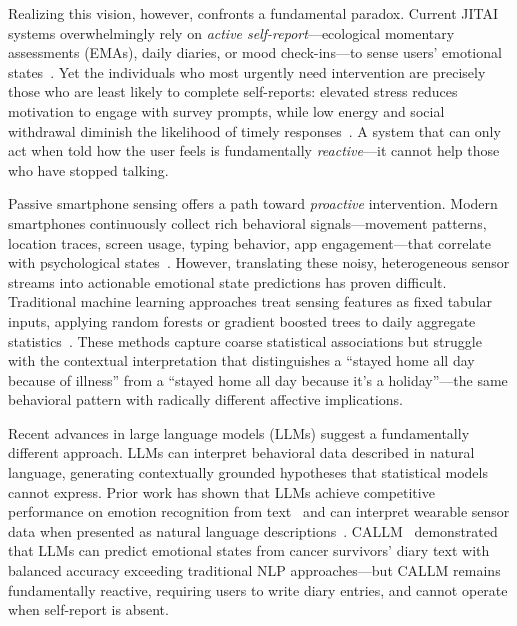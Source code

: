 \documentclass[screen,review,anonymous]{acmart}
\begin{document}
Realizing this vision, however, confronts a fundamental paradox. Current JITAI systems overwhelmingly rely on \emph{active self-report}---ecological momentary assessments (EMAs), daily diaries, or mood check-ins---to sense users' emotional states~\cite{shiffman2008ema}. Yet the individuals who most urgently need intervention are precisely those who are least likely to complete self-reports: elevated stress reduces motivation to engage with survey prompts, while low energy and social withdrawal diminish the likelihood of timely responses~\cite{mishra2021receptivity}. A system that can only act when told how the user feels is fundamentally \emph{reactive}---it cannot help those who have stopped talking.

Passive smartphone sensing offers a path toward \emph{proactive} intervention. Modern smartphones continuously collect rich behavioral signals---movement patterns, location traces, screen usage, typing behavior, app engagement---that correlate with psychological states~\cite{saeb2015phenotyping, wang2014studentlife, wang2018sensing}. However, translating these noisy, heterogeneous sensor streams into actionable emotional state predictions has proven difficult. Traditional machine learning approaches treat sensing features as fixed tabular inputs, applying random forests or gradient boosted trees to daily aggregate statistics~\cite{xu2023globem}. These methods capture coarse statistical associations but struggle with the contextual interpretation that distinguishes a ``stayed home all day because of illness'' from a ``stayed home all day because it's a holiday''---the same behavioral pattern with radically different affective implications.

Recent advances in large language models (LLMs) suggest a fundamentally different approach. LLMs can interpret behavioral data described in natural language, generating contextually grounded hypotheses that statistical models cannot express. Prior work has shown that LLMs achieve competitive performance on emotion recognition from text~\cite{yang2024llm_mental, amin2023llm_ema} and can interpret wearable sensor data when presented as natural language descriptions~\cite{kim2024health_llm, xu2024penetrative_ai}. CALLM~\cite{wang2026callm} demonstrated that LLMs can predict emotional states from cancer survivors' diary text with balanced accuracy exceeding traditional NLP approaches---but CALLM remains fundamentally reactive, requiring users to write diary entries, and cannot operate when self-report is absent.
\end{document}
